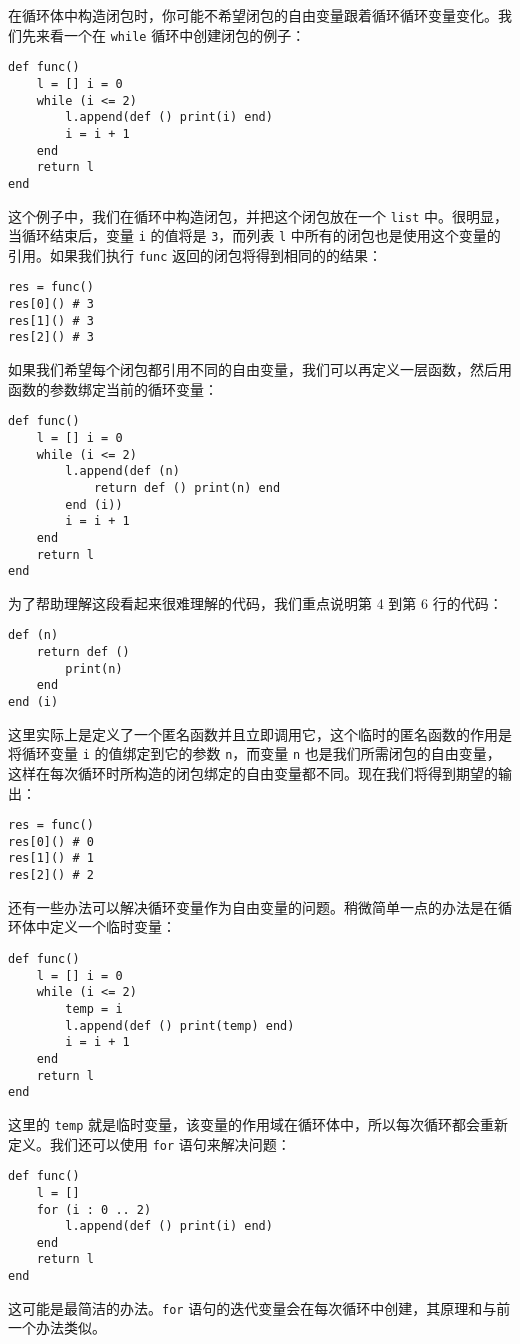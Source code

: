 在循环体中构造闭包时，你可能不希望闭包的自由变量跟着循环循环变量变化。我们先来看一个在 \texttt{while} 循环中创建闭包的例子：
\begin{lstlisting}[language=berry]
def func()
    l = [] i = 0
    while (i <= 2)
        l.append(def () print(i) end)
        i = i + 1
    end
    return l
end
\end{lstlisting}
这个例子中，我们在循环中构造闭包，并把这个闭包放在一个 \texttt{list} 中。很明显，当循环结束后，变量 \texttt{i} 的值将是 \texttt{3}，而列表 \texttt{l} 中所有的闭包也是使用这个变量的引用。如果我们执行 \texttt{func} 返回的闭包将得到相同的的结果：
\begin{lstlisting}[language=berry]
res = func()
res[0]() # 3
res[1]() # 3
res[2]() # 3
\end{lstlisting}
如果我们希望每个闭包都引用不同的自由变量，我们可以再定义一层函数，然后用函数的参数绑定当前的循环变量：
\begin{lstlisting}[language=berry]
def func()
    l = [] i = 0
    while (i <= 2)
        l.append(def (n)
            return def () print(n) end
        end (i))
        i = i + 1
    end
    return l
end
\end{lstlisting}
为了帮助理解这段看起来很难理解的代码，我们重点说明第 4 到第 6 行的代码：
\begin{lstlisting}[language=berry]
def (n)
    return def ()
        print(n)
    end
end (i)
\end{lstlisting}
这里实际上是定义了一个匿名函数并且立即调用它，这个临时的匿名函数的作用是将循环变量 \texttt{i} 的值绑定到它的参数 \texttt{n}，而变量 \texttt{n} 也是我们所需闭包的自由变量，这样在每次循环时所构造的闭包绑定的自由变量都不同。现在我们将得到期望的输出：
\begin{lstlisting}[language=berry]
res = func()
res[0]() # 0
res[1]() # 1
res[2]() # 2
\end{lstlisting}
还有一些办法可以解决循环变量作为自由变量的问题。稍微简单一点的办法是在循环体中定义一个临时变量：
\begin{lstlisting}[language=berry]
def func()
    l = [] i = 0
    while (i <= 2)
        temp = i
        l.append(def () print(temp) end)
        i = i + 1
    end
    return l
end
\end{lstlisting}
这里的 \texttt{temp} 就是临时变量，该变量的作用域在循环体中，所以每次循环都会重新定义。我们还可以使用 \texttt{for} 语句来解决问题：
\begin{lstlisting}[language=berry]
def func()
    l = []
    for (i : 0 .. 2)
        l.append(def () print(i) end)
    end
    return l
end
\end{lstlisting}
这可能是最简洁的办法。\texttt{for} 语句的迭代变量会在每次循环中创建，其原理和与前一个办法类似。

